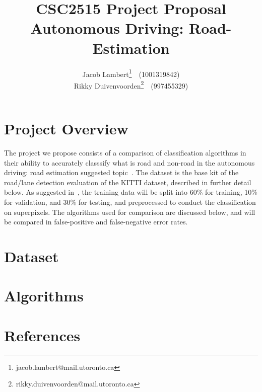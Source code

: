 \documentclass[a4paper,10pt]{article}
\title{\textbf{CSC2515 Project Proposal} \\
Autonomous Driving: Road-Estimation}
\author{
  Jacob Lambert\footnote{jacob.lambert@mail.utoronto.ca}~~(1001319842)\\
  Rikky Duivenvoorden\footnote{rikky.duivenvoorden@mail.utoronto.ca}~~(997455329) \\
}
\date{}
\begin{document}
\maketitle

\section{Project Overview}
The project we propose consists of a comparison of classification algorithms in their ability to accurately classsify what is road and non-road in the autonomous driving: road estimation suggested topic~\cite{csc2515_suggestedprojects}. The dataset is the base kit of the road/lane detection evaluation of the KITTI dataset, described in further detail below. As suggested in~\cite{csc2515_suggestedprojects}, the training data will be split into 60\% for training, 10\% for validation, and 30\% for testing, and preprocessed to conduct the classification on superpixels. The algorithms used for comparison are discussed below, and will be compared in false-positive and false-negative error rates.

\section{Dataset}

\section{Algorithms}

\section{References}
\end{document}
